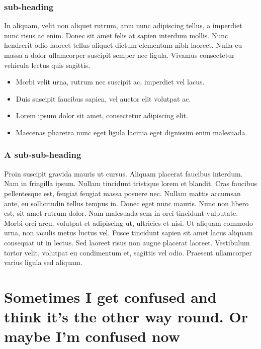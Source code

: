 \documentclass[11pt,oneside,openany]{book}
\begin{document}
\subsubsection{sub-heading}\hypertarget{sub-heading}{}\label{sub-heading}

In aliquam, velit non aliquet rutrum, arcu nunc adipiscing tellus, a imperdiet nunc risus ac enim. Donec sit amet felis at sapien interdum mollis. Nunc hendrerit odio laoreet tellus aliquet dictum elementum nibh laoreet. Nulla eu massa a dolor ullamcorper suscipit semper nec ligula. Vivamus consectetur vehicula lectus quis sagittis.

\begin{itemize}
\item Morbi velit urna, rutrum nec suscipit ac, imperdiet vel lacus.
\item Duis suscipit faucibus sapien, vel auctor elit volutpat ac.
\item Lorem ipsum dolor sit amet, consectetur adipiscing elit.
\item Maecenas pharetra nunc eget ligula lacinia eget dignissim enim malesuada.
\end{itemize}

\subsubsection{A sub-sub-heading}\hypertarget{a-sub-sub-heading}{}\label{a-sub-sub-heading}

Proin suscipit gravida mauris ut cursus. Aliquam placerat faucibus interdum. Nam in fringilla ipsum. Nullam tincidunt tristique lorem et blandit. Cras faucibus pellentesque est, feugiat feugiat massa posuere nec. Nullam mattis accumsan ante, eu sollicitudin tellus tempus in. Donec eget nunc mauris. Nunc non libero est, sit amet rutrum dolor. Nam malesuada sem in orci tincidunt vulputate. Morbi orci arcu, volutpat et adipiscing ut, ultricies et nisi. Ut aliquam commodo urna, non iaculis metus luctus vel. Fusce tincidunt sapien sit amet lacus aliquam consequat ut in lectus. Sed laoreet risus non augue placerat laoreet. Vestibulum tortor velit, volutpat eu condimentum et, sagittis vel odio. Praesent ullamcorper varius ligula sed aliquam.	

\section{Sometimes I get confused and think it's the other way round. Or maybe I'm confused now}\hypertarget{sometimes-i-get-confused-and-think-its-the-other-way-round-or-maybe-im-confused-now}{}\label{sometimes-i-get-confused-and-think-its-the-other-way-round-or-maybe-im-confused-now}
\end{document}
